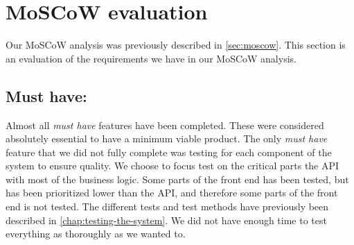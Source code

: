 \section{MoSCoW evaluation}
Our MoSCoW analysis was previously described in \autoref{sec:moscow}.
This section is an evaluation of the requirements we have in our MoSCoW analysis.

\subsection{Must have:}
Almost all \textit{must have} features have been completed.
These were considered absolutely essential to have a minimum viable product. 
The only \textit{must have} feature that we did not fully complete was testing for each component of the system to ensure quality.
We choose to focus test on the critical parts the API with most of the business logic. 
Some parts of the front end has been tested, but has been prioritized lower than the API, and therefore some parts of the front end is not tested. 
The different tests and test methods have previously been described in \autoref{chap:testing-the-system}.
We did not have enough time to test everything as thoroughly as we wanted to.

